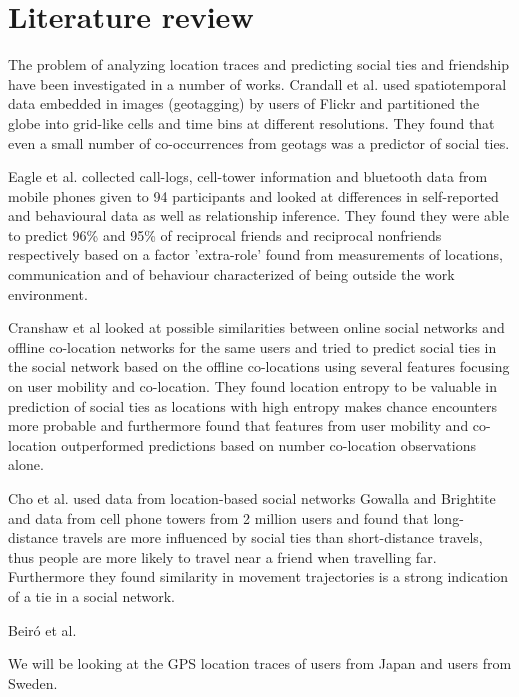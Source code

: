 \section{Literature review}
The problem of analyzing location traces and predicting social ties and friendship have been investigated in a number of works. Crandall et al.\cite{ISTfGC} used spatiotemporal data embedded in images (geotagging) by users of Flickr and partitioned the globe into grid-like cells and time bins at different resolutions. They found that even a small number of co-occurrences from geotags was a predictor of social ties.

Eagle et al.\cite{eagle} collected call-logs, cell-tower information and bluetooth data from mobile phones given to 94 participants and looked at differences in self-reported and behavioural data as well as relationship inference. They found they were able to predict 96\% and 95\% of reciprocal friends and reciprocal nonfriends respectively based on a factor 'extra-role' found from measurements of locations, communication and of behaviour characterized of being outside the work environment.

Cranshaw et al\cite{cranshaw2010bridging} looked at possible similarities between online social networks and offline co-location networks for the same users and tried to predict social ties in the social network based on the offline co-locations using several features focusing on user mobility and co-location. They found location entropy to be valuable in prediction of social ties as locations with high entropy makes chance encounters more probable and furthermore found that features from user mobility and co-location outperformed predictions based on number co-location observations alone.

Cho et al.\cite{FaMUMiLBSN} used data from location-based social networks Gowalla and Brightite and data from cell phone towers from 2 million users and found that long-distance travels are more influenced by social ties than short-distance travels, thus people are more likely to travel near a friend when travelling far. Furthermore they found similarity in movement trajectories is a strong indication of a tie in a social network.

Beiró et al. \cite{human_mob_through_assi}

We will be looking at the GPS location traces of \numberUsersJapan{} users from Japan and \numberUsersSweden{} users from Sweden.